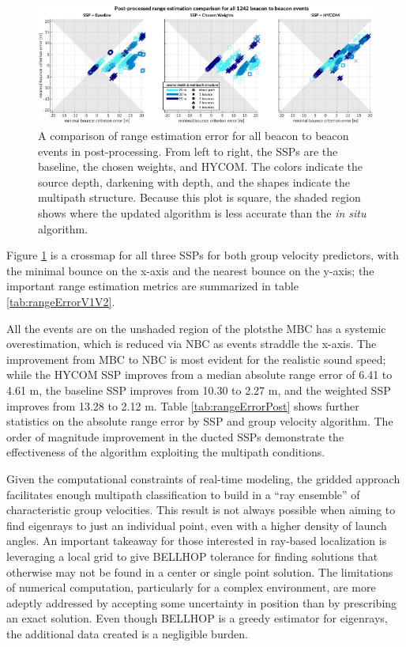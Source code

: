 \begin{figure}[h!]
\includegraphics[width=\textwidth]{figs/Fig7.pdf}
\caption{\label{fig:compareV1V2}{A comparison of range estimation error for all beacon to beacon events in post-processing. From left to right, the SSPs are the baseline, the chosen weights, and HYCOM. The colors indicate the source depth, darkening with depth, and the shapes indicate the multipath structure. Because this plot is square, the shaded region shows where the updated algorithm is less accurate than the \textit{in situ} algorithm.}}
\end{figure}

Figure \ref{fig:compareV1V2} is a crossmap for all three SSPs for both group velocity predictors, with the minimal bounce on the x-axis and the nearest bounce on the y-axis; the important range estimation metrics are summarized in table \ref{tab:rangeErrorV1V2}.

All the events are on the unshaded region of the plots\textemdash the MBC has a systemic overestimation, which is reduced via NBC as events straddle the x-axis.
The improvement from MBC to NBC is most evident for the realistic sound speed; while the HYCOM SSP improves from a median absolute range error of 6.41 to 4.61 m, the baseline SSP improves from 10.30 to 2.27 m, and the weighted SSP improves from 13.28 to 2.12 m.
Table \ref{tab:rangeErrorPost} shows further statistics on the absolute range error by SSP and group velocity algorithm.
The order of magnitude improvement in the ducted SSPs demonstrate the effectiveness of the algorithm exploiting the multipath conditions.

Given the computational constraints of real-time modeling, the gridded approach facilitates enough multipath classification to build in a ``ray ensemble'' of characteristic group velocities.
This result is not always possible when aiming to find eigenrays to just an individual point, even with a higher density of launch angles.
An important takeaway for those interested in ray-based localization is leveraging a local grid to give BELLHOP tolerance for finding solutions that otherwise may not be found in a center or single point solution.
The limitations of numerical computation, particularly for a complex environment, are more adeptly addressed by accepting some uncertainty in position than by prescribing an exact solution.
Even though BELLHOP is a greedy estimator for eigenrays, the additional data created is a negligible burden. 


